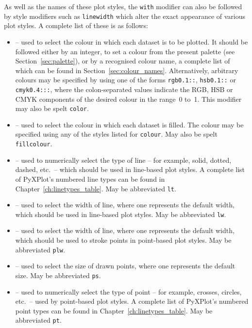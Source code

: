 As well as the names of these plot styles, the {\tt with} modifier can also be
followed by style modifiers such as {\tt line\-width} which alter the exact
appearance of various plot styles. A complete list of these is as follows:
\begin{itemize}
\item {} -- used to select the colour in which each dataset is to be plotted. It should be followed either by an integer, to set a colour from the present palette (see Section~\ref{sec:palette}), or by a recognised colour name, a complete list of which can be found in Section~\ref{sec:colour_names}. Alternatively, arbitrary colours may be specified by using one of the forms {\tt rgb0.1::}, {\tt hsb0.1::} or {\tt cmyk0.4:::}, where the colon-separated values indicate the RGB, HSB or CMYK components of the desired colour in the range~0 to~1. This modifier may also be spelt {\tt color}.
\item {} -- used to select the colour in which each dataset is filled. The colour may be specified using any of the styles listed for {\tt colour}. May also be spelt {\tt fillcolour}.
\item {} -- used to numerically select the type of line -- for example, solid, dotted, dashed, etc.\ -- which should be used in line-based plot styles. A complete list of PyXPlot's numbered line types can be found in Chapter~\ref{ch:linetypes_table}. May be abbreviated {\tt lt}.
\item {} -- used to select the width of line, where one represents the default width, which should be used in line-based plot styles. May be abbreviated {\tt lw}.
\item {} -- used to select the width of line, where one represents the default width, which should be used to stroke points in point-based plot styles. May be abbreviated {\tt plw}.
\item {} -- used to select the size of drawn points, where one represents the default size. May be abbreviated {\tt ps}.
\item {} -- used to numerically select the type of point -- for example, crosses, circles, etc.\ -- used by point-based plot styles. A complete list of PyXPlot's numbered point types can be found in Chapter~\ref{ch:linetypes_table}. May be abbreviated {\tt pt}.
\end{itemize}

